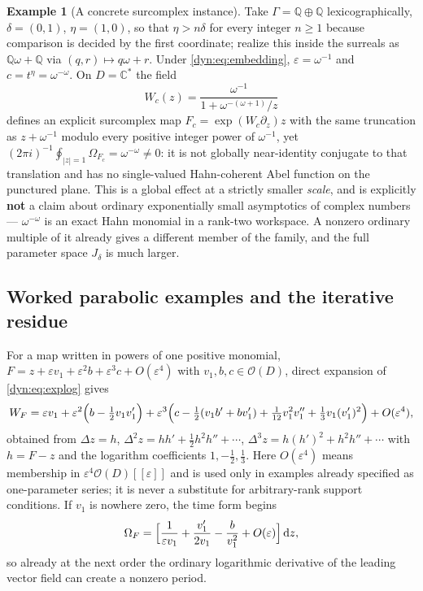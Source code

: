 \documentclass[11pt,letterpaper]{article}
\theoremstyle{definition}
\newtheorem{example}[example]{Example}
\theoremstyle{remark}
\newcommand{\C}{\mathbb C}
\newcommand{\Q}{\mathbb Q}
\newcommand{\OO}{\mathcal O}
\newcommand{\eps}{\varepsilon}
\newcommand{\dd}{\,\mathrm d}
\numberwithin{equation}{section}
\begin{document}
\begin{example}[A concrete surcomplex instance]\label{dyn:ex:flatsurcomplex}
Take $\Gamma=\Q\oplus\Q$ lexicographically, $\delta=(0,1)$,
$\eta=(1,0)$, so that $\eta>n\delta$ for every integer $n\ge1$ because
comparison is decided by the first coordinate; realize this inside the
surreals as $\Q\omega+\Q$ via $(q,r)\mapsto q\omega+r$. Under
\eqref{dyn:eq:embedding}, $\eps=\omega^{-1}$ and
$c=t^{\eta}=\omega^{-\omega}$. On $D=\C^{*}$ the field
\begin{equation}\label{dyn:eq:surreal-flat-example}
 W_c(z)=\frac{\omega^{-1}}{1+\omega^{-(\omega+1)}/z}
\end{equation}
defines an explicit surcomplex map $F_c=\exp(W_c\partial_z)z$ with the same
truncation as $z+\omega^{-1}$ modulo every positive integer power of
$\omega^{-1}$, yet
$(2\pi i)^{-1}\oint_{|z|=1}\Omega_{F_c}=\omega^{-\omega}\ne0$: it is not
globally near-identity conjugate to that translation and has no
single-valued Hahn-coherent Abel function on the punctured plane. This is a
global effect at a strictly smaller \emph{scale}, and is explicitly
\textbf{not} a claim about ordinary exponentially small asymptotics of
complex numbers --- $\omega^{-\omega}$ is an exact Hahn monomial in a
rank-two workspace. A nonzero ordinary multiple of it already gives a
different member of the family, and the full parameter space $J_\delta$ is
much larger.
\end{example}

\subsection{Worked parabolic examples and the iterative residue}
\label{dyn:subsec:eulerexamples}

For a map written in powers of one positive monomial,
$F=z+\eps v_1+\eps^{2}b+\eps^{3}c+O(\eps^{4})$ with
$v_1,b,c\in\OO(D)$, direct expansion of \eqref{dyn:eq:explog} gives
\begin{equation}\label{dyn:eq:log-first-terms}
 W_F=\eps v_1+\eps^{2}\Bigl(b-\tfrac12v_1v_1'\Bigr)
 +\eps^{3}\Bigl(c-\tfrac12(v_1b'+bv_1')+\tfrac1{12}v_1^{2}v_1''
 +\tfrac13v_1(v_1')^{2}\Bigr)+O(\eps^{4}),
\end{equation}
obtained from $\Delta z=h$, $\Delta^{2}z=hh'+\frac12h^{2}h''+\cdots$,
$\Delta^{3}z=h(h')^{2}+h^{2}h''+\cdots$ with $h=F-z$ and the logarithm
coefficients $1,-\frac12,\frac13$. Here $O(\eps^{4})$ means membership in
$\eps^{4}\OO(D)[[\eps]]$ and is used only in examples already specified as
one-parameter series; it is never a substitute for arbitrary-rank support
conditions. If $v_1$ is nowhere zero, the time form begins
\begin{equation}\label{dyn:eq:time-first-terms}
 \Omega_F=\Bigl[\frac1{\eps v_1}+\frac{v_1'}{2v_1}-\frac{b}{v_1^{2}}
 +O(\eps)\Bigr]\dd z ,
\end{equation}
so already at the next order the ordinary logarithmic derivative of the
leading vector field can create a nonzero period.
\end{document}
